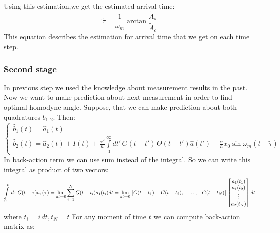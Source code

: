 Using this estimation,we get the estimated arrival time:
\begin{equation}
 \tilde{\tau} = \frac{1}{\omega_m}\arctan \frac{\tilde{A}_s}{\tilde{A}_c}
\end{equation}
This equation describes the estimation for arrival time that we get on each time step.

\subsubsection{Second stage}
In previous step we used the knowledge about measurement results in the past. Now we want to make prediction about next measurement in order to find optimal homodyne angle.
Suppose, that we can make prediction about both quadratures $b_{1,2}$. Then:
\begin{equation}
 \begin{cases}\label{b1b2}
  \hat{b}_1(t) = \hat{a}_1(t) \\
  \hat{b}_2(t) = \hat{a}_2(t)+ I(t) + \frac{\alpha^2}{\hbar}\int\limits_0^{\infty} dt' \, G(t-t') \,\Theta(t-t') \hat{a}(t') + \frac{\alpha}{\hbar}x_0 \sin \omega_m (t-\tilde{\tau})
 \end{cases}
\end{equation}
In back-action term we can use sum instead of the integral. So we can write this integral as product of two vectors:
\begin{equation}
 \int\limits_{0}^{t}\,d\tau\, G(t-\tau)a_1(\tau) = \lim\limits_{dt\rightarrow0}\sum\limits_{i=1}^NG(t-t_i) a_1(t_i) dt = \lim\limits_{dt\rightarrow0} 
\begin{bmatrix}
 G(t-t_1), & G(t-t_2), & \hdots, & G(t-t_N)
\end{bmatrix}
\begin{bmatrix}
 a_1(t_1)\\a_1(t_2)\\\vdots\\a_2(t_N)
\end{bmatrix}
dt
\end{equation}
where $t_i = i\,dt, t_N = t$
For any moment of time $t$ we can compute back-action matrix as:
